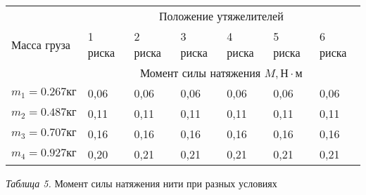 \begin{center}
    \begin{tabular}{|p{2.5cm}|p{2cm}|p{2cm}|p{2cm}|p{2cm}|p{2cm}|p{2cm}|}
        \hline
        \multirow{3}{*}{Масса груза} & \multicolumn{6}{c|}{Положение утяжелителей} \\
        \cline{2-7}
        & 1 риска       & 2 риска & 3 риска & 4 риска & 5 риска & 6 риска \\
        \cline{2-7}
        & \multicolumn{6}{c|}{Момент силы натяжения $M, \text{Н} \cdot \text{м}$} \\
        \hline
        $m_1 = 0.267 \text{кг}$ &   0,06    &   0,06    &    0,06   &    0,06   &    0,06   &   0,06    \\
        \hline
        $m_2 = 0.487 \text{кг}$ &   0,11    &   0,11    &    0,11   &    0,11   &     0,11   
        &   0,11    \\
        \hline
        $m_3 = 0.707 \text{кг}$ &   0,16    &   0,16    &    0,16   &    0,16   &    0,16   &   0,16    \\
        \hline
        $m_4 = 0.927 \text{кг}$ &   0,20    &   0,21    &    0,21   &    0,21   &    0,21   &   0,21    \\
        \hline

    \end{tabular}

    \smallvspace

    \textit{Таблица 5.} Момент силы натяжения нити при разных условиях
\end{center}
